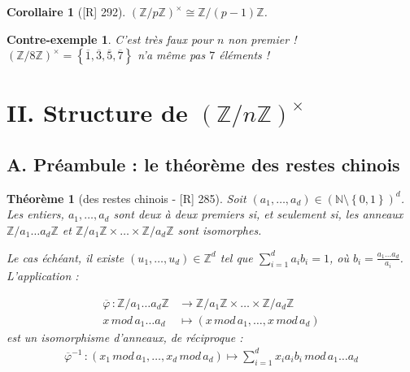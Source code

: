 \documentclass[10pt, a4paper, parskip=full, twoside, twocolumn]{report}
\newtheorem{theorem}[definition]{Théorème}
\newtheorem{corollary}[definition]{Corollaire}
\newtheorem{cexample}[definition]{Contre-exemple}
\newcommand{\IN}{\mathbb{N}}
\newcommand{\IZ}{\mathbb{Z}}
\newcommand{\IZnZ}{\mathbb{Z}/n\mathbb{Z}}
\begin{document}
\begin{corollary}[\textnormal{[R] 292}]
	$\left(\IZ/p\IZ\right)^{\times} \cong \IZ/(p-1)\IZ$.
\end{corollary}

\begin{cexample}
	C'est très faux pour $n$ non premier !
	$\left(\IZ/8\IZ\right)^{\times} = \left\{\overline{1},\overline{3},\overline{5},\overline{7}\right\}$ n'a même pas $7$ éléments !
\end{cexample}

\section*{II. Structure de $\left(\IZnZ\right)^{\times}$}
\subsection*{A. Préambule : le théorème des restes chinois}

\begin{tcolorbox}[
    breakable, %
    colback=developpement, %
    colframe=gray!0!black, %
    boxrule=0pt, %
    arc=1mm, %
	boxsep=0pt,
	left=0pt, right=0pt, top=0pt, bottom=0pt
]
\begin{theorem}[des restes chinois - \textnormal{[R] 285}]
	\label{120dev1}
	Soit $(a_1,\dots, a_d)\in \left(\IN\setminus \left\{0,1\right\}\right)^d$.
	Les entiers, $a_1,\dots, a_d$ sont deux à deux premiers si, et seulement si, les anneaux 
	$\IZ/a_1\dots a_d\IZ$ et $\IZ/a_1\IZ \times \dots \times \IZ/a_d\IZ$ sont isomorphes.

	Le cas échéant, il existe $(u_1,\dots,u_d)\in\IZ^d$ tel que $\sum_{i=1}^{d} a_ib_i =1$, où 
	$b_i = \frac{a_1\dots a_d}{a_i}$. L'application :

	\begin{align*}
		\overline{\varphi} \,\colon \IZ/a_1\dots a_d\IZ &\to \IZ/a_1\IZ \times \dots \times \IZ/a_d\IZ \\
		x\,mod\,a_1\dots a_d &\mapsto (x\,mod\,a_1,\dots, x\, mod\, a_d)
	\end{align*}
	est un isomorphisme d'anneaux, de réciproque :
	\begin{align*}
		\overline{\varphi}^{-1}\,\colon (x_1\,mod\,a_1,\dots, x_d\, mod\, a_d) \mapsto \sum_{i=1}^{d} x_i a_i b_i\, mod\, a_1\dots a_d
	\end{align*}
\end{theorem}
\end{tcolorbox}
\end{document}
